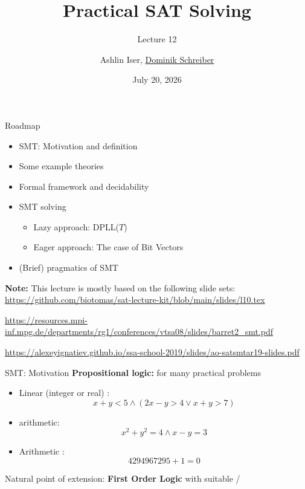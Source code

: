 \documentclass[t,english]{sdqbeamer}
\title{Practical SAT Solving}
\subtitle{Lecture 12 \unimp{\normalfont -- Satisfiability Modulo Theories (SMT)}}
\author{{Ashlin Iser}, \underline{Dominik Schreiber}}
\date{July 20, 2026}
\begin{document}
\begin{frame}[title white horizontal, picture=logos/blender-render, kitlogo=rgb]
	\titlepage
\end{frame}







\begin{frame}{Roadmap}
	
	\vspace*{-3mm}
	\begin{itemize}
		\item SMT: Motivation and definition
		\item Some example theories
		\item Formal framework and decidability
		\item SMT solving
		\begin{itemize}
			\item Lazy approach: DPLL($T$)
			\item Eager approach: The case of Bit Vectors
		\end{itemize}
		\item (Brief) pragmatics of SMT
	\end{itemize}
	
	\vspace*{8mm}
	
	\small
	\textbf{Note:} This lecture is mostly based on the following slide sets:\\
	
	\vspace*{2mm}
	\url{https://github.com/biotomas/sat-lecture-kit/blob/main/slides/l10.tex}\\
	\hfill{}
	
	\vspace*{2mm}
	\url{https://resources.mpi-inf.mpg.de/departments/rg1/conferences/vtsa08/slides/barret2_smt.pdf}\\
	\hfill{}
	
	\vspace*{2mm}
	\url{https://alexeyignatiev.github.io/ssa-school-2019/slides/ao-satsmtar19-slides.pdf}\\
	\hfill{}
\end{frame}

\begin{frame}{SMT: Motivation}
	\textbf{Propositional logic:}  for many practical problems
	\begin{itemize}
		\item Linear (integer or real) :
		\[ x+y < 5 \wedge (2x-y > 4 \vee x+y > 7) \]
		\item {} arithmetic:
		\[ x^2 + y^2 = 4 \wedge x-y = 3 \]
		\item Arithmetic :
		\[ 4294967295 + 1 = 0 \]
	\end{itemize}
	Natural point of extension: \textbf{First Order Logic} with suitable  / 
\end{frame}
\end{document}
